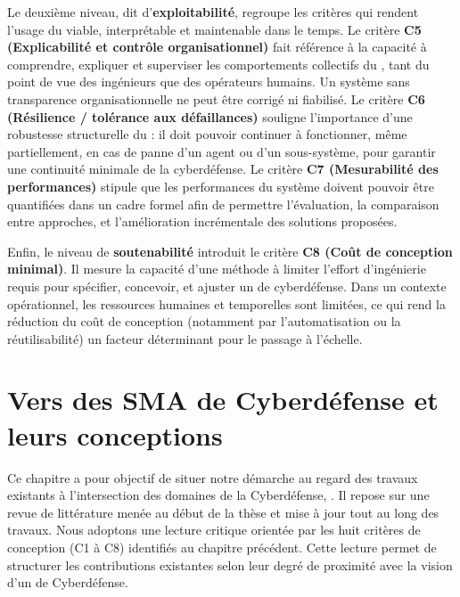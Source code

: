 Le deuxième niveau, dit d’\textbf{exploitabilité}, regroupe les critères qui rendent l’usage du  viable, interprétable et maintenable dans le temps. Le critère \textbf{C5 (Explicabilité et contrôle organisationnel)} fait référence à la capacité à comprendre, expliquer et superviser les comportements collectifs du , tant du point de vue des ingénieurs que des opérateurs humains. Un système sans transparence organisationnelle ne peut être corrigé ni fiabilisé. Le critère \textbf{C6 (Résilience / tolérance aux défaillances)} souligne l’importance d’une robustesse structurelle du  : il doit pouvoir continuer à fonctionner, même partiellement, en cas de panne d’un agent ou d’un sous-système, pour garantir une continuité minimale de la cyberdéfense. Le critère \textbf{C7 (Mesurabilité des performances)} stipule que les performances du système doivent pouvoir être quantifiées dans un cadre formel afin de permettre l’évaluation, la comparaison entre approches, et l’amélioration incrémentale des solutions proposées.

Enfin, le niveau de \textbf{soutenabilité} introduit le critère \textbf{C8 (Coût de conception minimal)}. Il mesure la capacité d’une méthode à limiter l’effort d’ingénierie requis pour spécifier, concevoir, et ajuster un  de cyberdéfense. Dans un contexte opérationnel, les ressources humaines et temporelles sont limitées, ce qui rend la réduction du coût de conception (notamment par l’automatisation ou la réutilisabilité) un facteur déterminant pour le passage à l'échelle.

\clearpage
\thispagestyle{empty}
\null
\newpage


\chapter{Vers des SMA de Cyberdéfense et leurs conceptions}

% 

\noindent
Ce chapitre a pour objectif de situer notre démarche au regard des travaux existants à l'intersection des domaines de la Cyberdéfense, . Il repose sur une revue de littérature menée au début de la thèse et mise à jour tout au long des travaux.
%
Nous adoptons une lecture critique orientée par les huit critères de conception (C1 à C8) identifiés au chapitre précédent. Cette lecture permet de structurer les contributions existantes selon leur degré de proximité avec la vision d'un  de Cyberdéfense.

